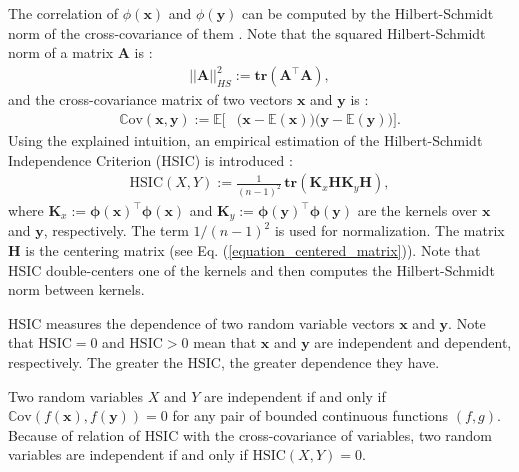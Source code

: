 \documentclass[lang=cn,10pt]{gorgeousnbook}
\numberwithin{equation}{section}%
\numberwithin{figure}{section}%
\begin{document}
The correlation of $\phi(\boldsymbol{x})$ and $\phi(\boldsymbol{y})$ can be computed by the Hilbert-Schmidt norm of the cross-covariance of them \cite{gretton2005measuring}. Note that the squared Hilbert-Schmidt norm of a matrix $\boldsymbol{A}$ is \cite{bell2016trace}:
\begin{align}
||\boldsymbol{A}||_{HS}^2 := \textbf{tr}(\boldsymbol{A}^\top \boldsymbol{A}),
\end{align}
and the cross-covariance matrix of two vectors $\boldsymbol{x}$ and $\boldsymbol{y}$ is \cite{gubner2006probability,gretton2005measuring}:
\begin{align}
\mathbb{C}\text{ov}(\boldsymbol{x}, \boldsymbol{y}) := \mathbb{E}\Big[&\big(\boldsymbol{x} - \mathbb{E}(\boldsymbol{x})\big) \big(\boldsymbol{y} - \mathbb{E}(\boldsymbol{y})\big) \Big].
\end{align}
Using the explained intuition, an empirical estimation of the Hilbert-Schmidt Independence Criterion (HSIC) is introduced \cite{gretton2005measuring}:
\begin{align}\label{equation_HSIC}
\text{HSIC}(X,Y) := \frac{1}{(n-1)^2}\, \textbf{tr}(\boldsymbol{K}_x\boldsymbol{H}\boldsymbol{K}_y\boldsymbol{H}),
\end{align}
where $\boldsymbol{K}_x := \boldsymbol{\phi}(\boldsymbol{x})^\top \boldsymbol{\phi}(\boldsymbol{x})$ and $\boldsymbol{K}_y := \boldsymbol{\phi}(\boldsymbol{y})^\top \boldsymbol{\phi}(\boldsymbol{y})$ are the kernels over $\boldsymbol{x}$ and $\boldsymbol{y}$, respectively. 
The term $1/(n-1)^2$ is used for normalization.
The matrix $\boldsymbol{H}$ is the centering matrix (see Eq. (\ref{equation_centered_matrix})).
Note that HSIC double-centers one of the kernels and then computes the Hilbert-Schmidt norm between kernels. 

HSIC measures the dependence of two random variable vectors $\boldsymbol{x}$ and $\boldsymbol{y}$. Note that $\text{HSIC}=0$ and $\text{HSIC}>0$ mean that $\boldsymbol{x}$ and $\boldsymbol{y}$ are independent and dependent, respectively. The greater the HSIC, the greater dependence they have.

\begin{lemma}
Two random variables $X$ and $Y$ are independent if and only if $\mathbb{C}\text{ov}(f(\boldsymbol{x}), f(\boldsymbol{y})) = 0$ for any pair of bounded continuous functions $(f,g)$. Because of relation of HSIC with the cross-covariance of variables, two random variables are independent if and only if $\text{HSIC}(X,Y) = 0$.
\end{lemma}
\end{document}
